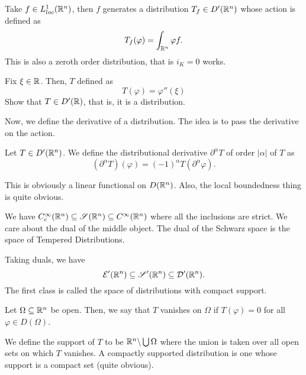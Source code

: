 \begin{example}
    Take $f\in L^1_{loc}(\mathbb{R}^n)$, then $f$ generates a distribution $T_f\in D'(\mathbb{R}^n)$ whose action is defined as 
    \begin{equation*}
        T_f(\varphi) = \int_{\mathbb{R}^n} \varphi f.
    \end{equation*}
    This is also a zeroth order distribution, that is $i_K = 0$ works.
\end{example}

\begin{example}
    Fix $\xi\in\mathbb{R}$. Then, $T$ defined as 
    \begin{equation*}
        T(\varphi) = \varphi''(\xi)
    \end{equation*}
    Show that $T\in D'(\mathbb{R})$, that is, it is a distribution.
\end{example}

\hrulefill 

Now, we define the derivative of a distribution. The idea is to pass the derivative on the action.

\begin{theorem}
    Let $T\in D'(\mathbb{R}^n)$. We define the distributional derivative $\partial^\alpha T$ of order $|\alpha|$ of $T$ as 
    \begin{equation*}
        (\partial^\alpha T)(\varphi) = (-1)^\alpha T(\partial^\alpha\varphi).
    \end{equation*}
\end{theorem}
This is obviously a linear functional on $D(\mathbb{R}^n)$. Also, the local boundedness thing is quite obvious.

\hrulefill 

We have $C_c^\infty(\mathbb{R}^n)\subseteq\mathscr S(\mathbb{R}^n)\subseteq C^\infty(\mathbb{R}^n)$ where all the inclusions are strict. We care about the dual of the middle object. The dual of the Schwarz space is the space of Tempered Distributions.

Taking duals, we have 
\begin{equation*}
    \mathcal E'(\mathbb{R}^n)\subseteq\mathscr S'(\mathbb{R}^n)\subseteq\mathcal D'(\mathbb{R}^n).
\end{equation*}
The first class is called the space of distributions with compact support.

Let $\Omega\subseteq\mathbb{R}^n$ be open. Then, we say that $T$ vanishes on $\Omega$ if $T(\varphi) = 0$ for all $\varphi\in D(\Omega)$. 

We define the support of $T$ to be $\mathbb{R}^n\backslash\bigcup\Omega$ where the union is taken over all open sets on which $T$ vanishes. A compactly supported distribution is one whose support is a compact set (quite obvious).

